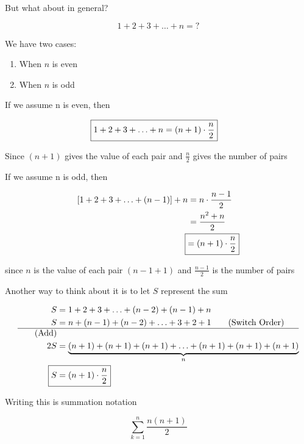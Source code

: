 \documentclass[../../Main.tex]{subfiles}
\begin{document}
\begin{example}

    But what about in general?
    
    $$1 + 2 + 3 + \ldots + n = ?$$

    We have two cases:
    
    \begin{enumerate}
        \item When $n$ is even
        \item When $n$ is odd
    \end{enumerate}

    If we assume n is even, then

    \begin{align}
        \Aboxed{1 + 2 + 3 + \ldots + n = (n + 1) \cdot \frac{n}{2}}
    \end{align}

    Since $(n + 1)$ gives the value of each pair and $\frac{n}{2}$ gives the number of pairs

    If we assume n is odd, then

    \begin{align*}
        \left[ 1 + 2 + 3 + \ldots + (n - 1) \right] + n &= n \cdot \frac{n - 1}{2} \\
        &= \frac{n^2 + n}{2} \\
        \Aboxed{&= (n + 1) \cdot \frac{n}{2}} \\
    \end{align*}

    since $n$ is the value of each pair $(n - 1 + 1)$ and $\frac{n - 1}{2}$ is the number of pairs

    \medskip 

    Another way to think about it is to let $S$ represent the sum

    \begin{align*}
        S &= 1 + 2 + 3 + \ldots + (n - 2) + (n - 1) + n \\
        S &= n + (n - 1) + (n - 2) + \ldots + 3 + 2 + 1 \tag{Switch Order} \\
        \hline \tag{Add} \\
        2S &= \underbrace{(n + 1) + (n + 1) + (n + 1) + \ldots + (n + 1) + (n + 1) + (n + 1)}_{n} \\
        \Aboxed{S &= (n + 1) \cdot \frac{n}{2}}
    \end{align*}

    Writing this is summation notation

    $$\sum_{k = 1}^{n} \frac{n(n + 1)}{2}$$

\end{example}
\end{document}
